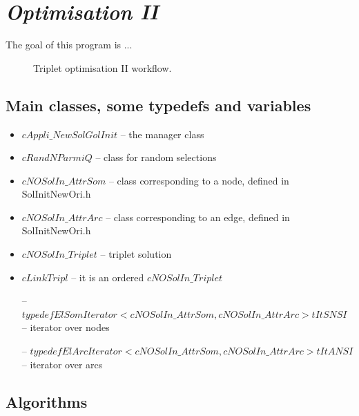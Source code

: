 \section{\textit{Optimisation II} }
The goal of this program is ...



\begin{figure}[h!]
\centering
{}
\caption{Triplet optimisation II workflow.}\label{fig:workfOptim2}
\end{figure}


\subsection{Main classes, some typedefs and variables}
\begin{itemize}
\item $cAppli\_NewSolGolInit$ -- the manager class
\item $cRandNParmiQ$ -- class for random selections
\item $cNOSolIn\_AttrSom$ -- class corresponding to a node, defined in SolInitNewOri.h
\item $cNOSolIn\_AttrArc$ -- class corresponding to an edge, defined in SolInitNewOri.h
\item $cNOSolIn\_Triplet$ -- triplet solution 
\item $cLinkTripl$ -- it is an ordered  $cNOSolIn\_Triplet$

\item[--] $typedef  ElSomIterator<cNOSolIn\_AttrSom,cNOSolIn\_AttrArc> tItSNSI$ -- iterator over nodes
\item[--] $typedef  ElArcIterator<cNOSolIn\_AttrSom,cNOSolIn\_AttrArc> tItANSI$ -- iterator over arcs
\end{itemize}


\subsection{Algorithms} 

